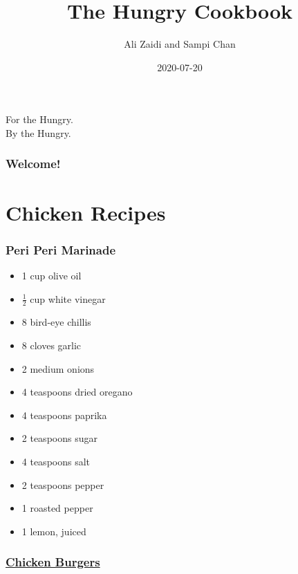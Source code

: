 \documentclass[]{article}
\title{The Hungry Cookbook}
\author{Ali Zaidi and Sampi Chan}
\date{2020-07-20}
\providecommand{\tightlist}{%
  \setlength{\itemsep}{0pt}\setlength{\parskip}{0pt}}
\begin{document}
\maketitle


\begin{center}
For the Hungry. \\
By the Hungry.

\end{center}

{
\setcounter{tocdepth}{2}
\tableofcontents
}
\hypertarget{welcome}{%
\section*{Welcome!}\label{welcome}}

\hypertarget{part-chicken-recipes}{%
\part{Chicken Recipes}\label{part-chicken-recipes}}

\hypertarget{peri-peri-marinade}{%
\section{Peri Peri Marinade}\label{peri-peri-marinade}}

\begin{itemize}
\tightlist
\item
  1 cup olive oil
\item
  \(\frac{1}{2}\) cup white vinegar
\item
  8 bird-eye chillis
\item
  8 cloves garlic
\item
  2 medium onions
\item
  4 teaspoons dried oregano
\item
  4 teaspoons paprika
\item
  2 teaspoons sugar
\item
  4 teaspoons salt
\item
  2 teaspoons pepper
\item
  1 roasted pepper
\item
  1 lemon, juiced
\end{itemize}

\hypertarget{chicken-burgers}{%
\section{\texorpdfstring{\href{https://www.foodnetwork.com/recipes/rachael-ray/bbq-chicken-burgers-with-slaw-recipe-1917239}{Chicken Burgers}}{Chicken Burgers}}\label{chicken-burgers}}
\end{document}
